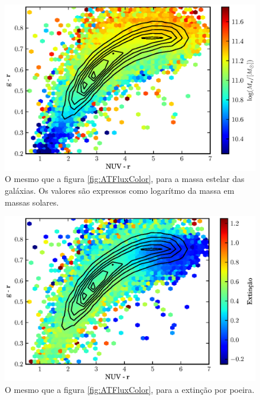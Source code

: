 \begin{figure}
	\includegraphics{figuras/uvcolor-color-mcor_gal.eps}
	\caption[Massa estelar das galáxias no diagrama cor--cor UV.]
	{O mesmo que a figura \ref{fig:ATFluxColor}, para a massa estelar das
	galáxias. Os valores são expressos como logarítmo da massa em massas solares.}
	\label{fig:MCorGalColor}
\end{figure}

\begin{figure}
	\includegraphics{figuras/uvcolor-color-AV.eps}
	\caption[Absorção por poeira no diagrama cor--cor UV.]
	{O mesmo que a figura \ref{fig:ATFluxColor}, para a extinção por
	poeira.}
	\label{fig:AV}
\end{figure}




